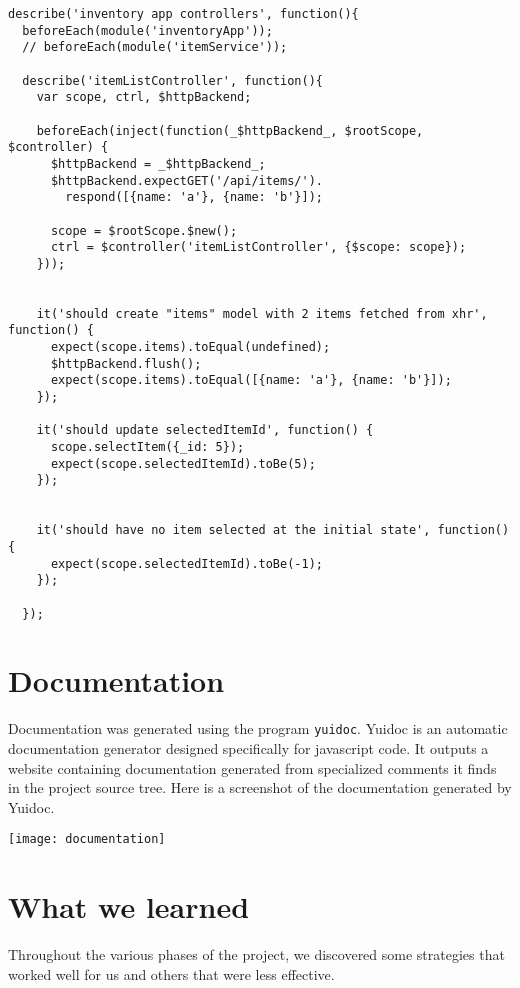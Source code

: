 \documentclass[letterpaper, 12pt]{article}
\begin{document}
\begingroup
    \fontsize{10pt}{12pt}\selectfont
\vspace{-3mm}\begin{verbatim}
describe('inventory app controllers', function(){
  beforeEach(module('inventoryApp'));
  // beforeEach(module('itemService'));

  describe('itemListController', function(){
    var scope, ctrl, $httpBackend;

    beforeEach(inject(function(_$httpBackend_, $rootScope, $controller) {
      $httpBackend = _$httpBackend_;
      $httpBackend.expectGET('/api/items/').
        respond([{name: 'a'}, {name: 'b'}]);

      scope = $rootScope.$new();
      ctrl = $controller('itemListController', {$scope: scope});
    }));


    it('should create "items" model with 2 items fetched from xhr', function() {
      expect(scope.items).toEqual(undefined);
      $httpBackend.flush();
      expect(scope.items).toEqual([{name: 'a'}, {name: 'b'}]);
    });

    it('should update selectedItemId', function() {
      scope.selectItem({_id: 5});
      expect(scope.selectedItemId).toBe(5);
    });


    it('should have no item selected at the initial state', function() {
      expect(scope.selectedItemId).toBe(-1);
    });

  });
\end{verbatim}
\endgroup

\section{Documentation}
Documentation was generated using the program \texttt{yuidoc}.  Yuidoc is an automatic documentation generator designed specifically for javascript code.  It outputs a website containing documentation generated from specialized comments it finds in the project source tree. Here is a screenshot of the documentation generated by Yuidoc.

	\begin{centering}
	\texttt{[image: documentation]}
    \end{centering}

\section{What we learned}
Throughout the various phases of the project, we discovered some strategies that worked well for us and others that were less effective.
\end{document}
